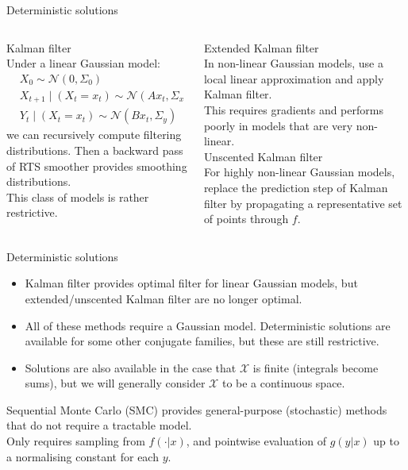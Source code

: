 \documentclass[aspectratio=169]{beamer}
\theoremstyle{definition}
\newcommand{\N}{\mathcal{N}}
\begin{document}
\begin{frame}{Deterministic solutions}
\begin{columns}
\begin{column}{0.45\textwidth}
{\Large Kalman filter \cite{kalman1960}}\\
Under a linear Gaussian model:
\begin{align*}
& X_0 \sim \N(0, \Sigma_0) \\
& X_{t+1} \mid (X_t = x_t) \sim \N(A x_t, \Sigma_x) \\
& Y_t \mid (X_t = x_t) \sim \N(B x_t, \Sigma_y)
\end{align*}
we can recursively compute filtering distributions. 
Then a backward pass of RTS smoother \cite{rauch1965} provides smoothing distributions.\\[7pt]
This class of models is rather restrictive.
\end{column}
\pause
\begin{column}{0.45\textwidth}
{\Large Extended Kalman filter \cite{jazwinski2007}}\\
In non-linear Gaussian models, use a local linear approximation and apply Kalman filter.\\[7pt]
This requires gradients and performs poorly in models that are very non-linear.\\[12pt]
\pause
{\Large Unscented Kalman filter \cite{wan2000}}\\
For highly non-linear Gaussian models, replace the prediction step of Kalman filter by propagating a representative set of points through $f$.
\end{column}
\end{columns}
\end{frame}

\begin{frame}{Deterministic solutions}
\begin{itemize}
\item Kalman filter provides optimal filter for linear Gaussian models, but extended/unscented Kalman filter are no longer optimal.\\[7pt] %
\pause
\item All of these methods require a Gaussian model.
Deterministic solutions are available for some other conjugate families, but these are still restrictive. \\[7pt]
\pause
\item Solutions are also available in the case that $\mathcal{X}$ is finite (integrals become sums), but we will generally consider $\mathcal{X}$ to be a continuous space. \\[7pt]
\end{itemize}
\pause
Sequential Monte Carlo (SMC) provides general-purpose (stochastic) methods that do not require a tractable model.\\[7pt]
\pause 
Only requires sampling from $f(\cdot | x)$, and pointwise evaluation of $g(y | x)$ up to a normalising constant for each $y$.
\end{frame}
\end{document}

